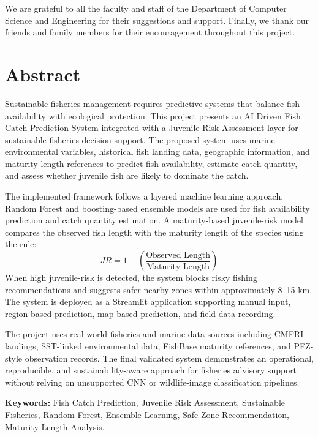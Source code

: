 \documentclass[12pt,a4paper]{report}
\begin{document}
We are grateful to all the faculty and staff of the Department of Computer Science and Engineering for their suggestions and support. Finally, we thank our friends and family members for their encouragement throughout this project.

\chapter*{Abstract}
Sustainable fisheries management requires predictive systems that balance fish availability with ecological protection. This project presents an AI Driven Fish Catch Prediction System integrated with a Juvenile Risk Assessment layer for sustainable fisheries decision support. The proposed system uses marine environmental variables, historical fish landing data, geographic information, and maturity-length references to predict fish availability, estimate catch quantity, and assess whether juvenile fish are likely to dominate the catch.

The implemented framework follows a layered machine learning approach. Random Forest and boosting-based ensemble models are used for fish availability prediction and catch quantity estimation. A maturity-based juvenile-risk model compares the observed fish length with the maturity length of the species using the rule:
\[
JR = 1 - \left(\frac{\text{Observed Length}}{\text{Maturity Length}}\right)
\]
When high juvenile-risk is detected, the system blocks risky fishing recommendations and suggests safer nearby zones within approximately 8--15 km. The system is deployed as a Streamlit application supporting manual input, region-based prediction, map-based prediction, and field-data recording.

The project uses real-world fisheries and marine data sources including CMFRI landings, SST-linked environmental data, FishBase maturity references, and PFZ-style observation records. The final validated system demonstrates an operational, reproducible, and sustainability-aware approach for fisheries advisory support without relying on unsupported CNN or wildlife-image classification pipelines.

\noindent \textbf{Keywords:} Fish Catch Prediction, Juvenile Risk Assessment, Sustainable Fisheries, Random Forest, Ensemble Learning, Safe-Zone Recommendation, Maturity-Length Analysis.

\tableofcontents
\listoftables
\listoffigures
\end{document}
